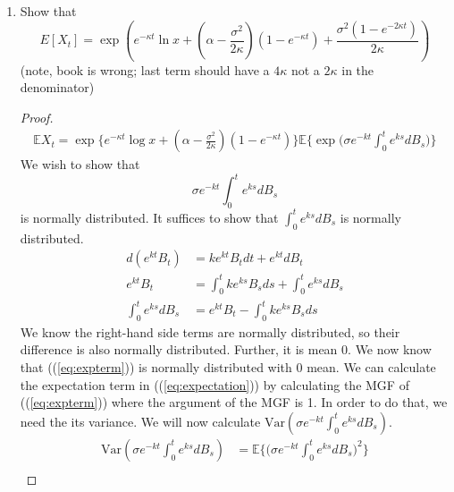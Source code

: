 \documentclass[11pt]{article}
\newcommand{\var}{\mrm{Var}}
\newcommand{\ga}{\alpha}
\newcommand{\gk}{\kappa}
\newcommand{\gs}{\sigma}
\newcommand{\mrm}{\mathrm}
\newcommand{\E}{\mathbb{E}}
\let\oldref\ref
\renewcommand{\ref}[1]{(\oldref{#1})}
\begin{document}
\begin{enumerate}
\begin{proof}
\begin{align*}
\end{align*}
Taking our initial condition $X_0=x>0$, we get $Y_0 = \log X_0 = \log x$.  Therefore, substituting $Y_t = e^{X_t}$ back into the equation, we get:
\begin{align*}
\log X_t &= e^{\gk t} \log x +  (\ga - \frac{\gs^2}{2 \gk})(1-e^{-\gk t}) + \gs e^{-\gk t} \int_0^t dB_s \\
X_t &= \exp \Big\{ e^{\gk t} \log x +  (\ga - \frac{\gs^2}{2 \gk})(1-e^{-\gk t}) + \gs e^{-\gk t} \int_0^t dB_s  \Big\}
\end{align*}
as expected.
 \end{proof}
 \item Show that  $$E \left[ X _ { t } \right] = \exp \left( e ^ { - \kappa t } \ln x + \left( \alpha - \frac { \sigma ^ { 2 } } { 2 \kappa } \right) \left( 1 - e ^ { - \kappa t } \right) + \frac { \sigma ^ { 2 } \left( 1 - e ^ { - 2 \kappa t } \right) } { 2 \kappa } \right)$$
 (note, book is wrong; last term should have a $4 \gk$ not a $2 \gk$ in the denominator)
 \begin{proof} 
 \begin{align} \label{eq:expectation}
 \E X_t = \exp \Big\{ e^{-\gk t} \log x + (\ga -\frac{\gs^2}{2 \gk})(1-e^{-\gk t} ) \Big\} \E \Big\{\exp \big( \gs e^{-kt} \int_0^t e^{ks} dB_s \big) \Big\}
 \end{align}
 We wish to show that $$ \label{eq:expterm}\gs e^{-kt} \int_0^t e^{ks} dB_s$$ is normally distributed.  It suffices to show that  $\int_0^t e^{ks} dB_s$ is normally distributed.
 \begin{align*}
d(e^{kt}B_t) &= ke^{kt} B_t dt + e^{kt} dB_t\\
e^{kt} B_t &= \int_0^t ke^{ks} B_s ds + \int_0^t e^{ks} dB_s\\
\int_0^t e^{ks} dB_s &= e^{kt}B_t - \int_0^t ke^{ks} B_s ds 
 \end{align*}
 We know the right-hand side terms are normally distributed, so their difference is also normally distributed.  Further, it is mean $0$. 
We now know that (\ref{eq:expterm}) is normally distributed with $0$ mean.  We can calculate the expectation term in (\ref{eq:expectation}) by calculating the MGF of (\ref{eq:expterm}) where the argument of the MGF is 1.  In order to do that, we need the its variance.  We will now calculate $\var(\gs e^{-kt} \int_0^t e^{ks} dB_s )$.
\begin{align*}
\var(\gs e^{-kt} \int_0^t e^{ks} dB_s ) &= \E \Big\{ \big( \gs e^{-kt} \int_0^t e^{ks} dB_s \big)^2 \Big\}\\

\end{align*}
\end{proof}
\end{enumerate}
\end{document}
